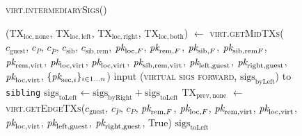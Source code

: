 \begin{figure}[H]
  \begin{processbox}{\textsc{virt.intermediarySigs}()}
    \begin{algorithmic}[1]
      \State ($\mathrm{TX}_{\mathrm{loc}, \mathrm{none}}$,
      $\mathrm{TX}_{\mathrm{loc}, \mathrm{left}}$, $\mathrm{TX}_{\mathrm{loc},
      \mathrm{right}}$, $\mathrm{TX}_{\mathrm{loc}, \mathrm{both}}$) $\gets$
      \textsc{virt.getMidTXs}($c_{\mathrm{guest}}$, $c_P$, $c_{\bar{P}}$,
      $c_{\mathrm{sib}}$, $c_{\mathrm{sib}, \mathrm{rem}}$, $\textit{pk}_{\mathrm{loc},
      F}$, $\textit{pk}_{\mathrm{rem}, F}$, $\textit{pk}_{\mathrm{sib}, F}$, $\textit{pk}_{\mathrm{sib},
      \mathrm{rem} F}$, $\textit{pk}_{\mathrm{rem}, \mathrm{virt}}$, $\textit{pk}_{\mathrm{loc},
      \mathrm{virt}}$, $\textit{pk}_{\mathrm{loc}, \mathrm{virt}}$, $\textit{pk}_{\mathrm{sib},
      \mathrm{rem}, \mathrm{virt}}$, $\textit{pk}_{\mathrm{left}, \mathrm{guest}}$,
      $\textit{pk}_{\mathrm{right}, \mathrm{guest}}$, $\textit{pk}_{\mathrm{loc}, \mathrm{virt}}$,
      $\{\textit{pk}_{\mathrm{sec}, i}\}_{i \in 1 \dots n}$)
      \State {}
      \State input (\textsc{virtual sigs forward},
      $\mathrm{sigs}_{\mathrm{byLeft}}$) to \texttt{sibling}
      \State {}
      \State $\mathrm{sigs}_{\mathrm{toLeft}} \gets
      \mathrm{sigs}_{\mathrm{byRight}} + \mathrm{sigs}_{\mathrm{toLeft}}$
        \State $\mathrm{TX}_{\mathrm{prev}, \mathrm{none}}$ $\gets$
        \textsc{virt.getEdgeTXs}($c_{\mathrm{guest}}$, $c_{\bar{P}}$, $c_P$,
        $\textit{pk}_{\mathrm{rem}, F}$, $\textit{pk}_{\mathrm{loc}, F}$, $\textit{pk}_{\mathrm{rem},
        \mathrm{virt}}$, $\textit{pk}_{\mathrm{loc}, \mathrm{virt}}$, $\textit{pk}_{\mathrm{loc},
        \mathrm{virt}}$, $\textit{pk}_{\mathrm{left}, \mathrm{guest}}$,
        $\textit{pk}_{\mathrm{right}, \mathrm{guest}}$, True)
      \EndIf
      \State \Return $\mathrm{sigs}_{\mathrm{toLeft}}$
    \end{algorithmic}
  \end{processbox}
  \caption{}
  \label{code:virtual-layer:intermediary-sigs}
\end{figure}

